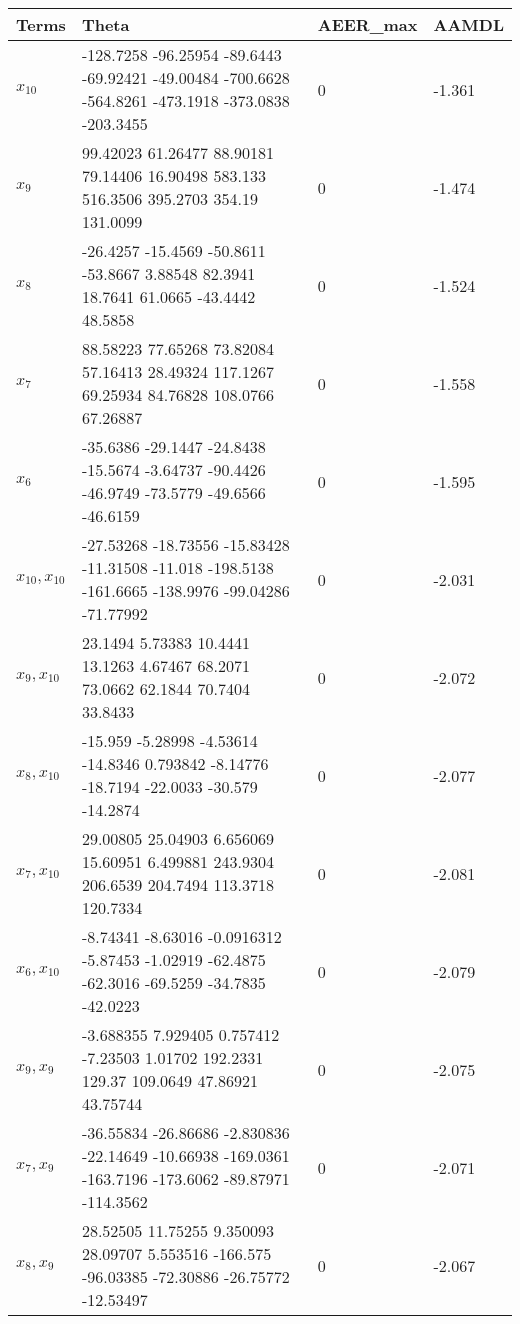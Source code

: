 \begin{tabular}{llll}
Terms & Theta & AEER_max & AAMDL \\ 
\hline 
$x_10$ & -128.7258     -96.25954      -89.6443     -69.92421     -49.00484     -700.6628     -564.8261     -473.1918     -373.0838     -203.3455 & 0 & -1.361 \\ 
$x_9$ & 99.42023      61.26477      88.90181      79.14406      16.90498       583.133      516.3506      395.2703        354.19      131.0099 & 0 & -1.474 \\ 
$x_8$ & -26.4257     -15.4569     -50.8611     -53.8667      3.88548      82.3941      18.7641      61.0665     -43.4442      48.5858 & 0 & -1.524 \\ 
$x_7$ & 88.58223      77.65268      73.82084      57.16413      28.49324      117.1267      69.25934      84.76828      108.0766      67.26887 & 0 & -1.558 \\ 
$x_6$ & -35.6386     -29.1447     -24.8438     -15.5674     -3.64737     -90.4426     -46.9749     -73.5779     -49.6566     -46.6159 & 0 & -1.595 \\ 
$x_10,x_10$ & -27.53268     -18.73556     -15.83428     -11.31508       -11.018     -198.5138     -161.6665     -138.9976     -99.04286     -71.77992 & 0 & -2.031 \\ 
$x_9,x_10$ & 23.1494      5.73383      10.4441      13.1263      4.67467      68.2071      73.0662      62.1844      70.7404      33.8433 & 0 & -2.072 \\ 
$x_8,x_10$ & -15.959     -5.28998     -4.53614     -14.8346     0.793842     -8.14776     -18.7194     -22.0033      -30.579     -14.2874 & 0 & -2.077 \\ 
$x_7,x_10$ & 29.00805      25.04903      6.656069      15.60951      6.499881      243.9304      206.6539      204.7494      113.3718      120.7334 & 0 & -2.081 \\ 
$x_6,x_10$ & -8.74341     -8.63016   -0.0916312     -5.87453     -1.02919     -62.4875     -62.3016     -69.5259     -34.7835     -42.0223 & 0 & -2.079 \\ 
$x_9,x_9$ & -3.688355      7.929405      0.757412      -7.23503       1.01702      192.2331        129.37      109.0649      47.86921      43.75744 & 0 & -2.075 \\ 
$x_7,x_9$ & -36.55834     -26.86686     -2.830836     -22.14649     -10.66938     -169.0361     -163.7196     -173.6062     -89.87971     -114.3562 & 0 & -2.071 \\ 
$x_8,x_9$ & 28.52505      11.75255      9.350093      28.09707      5.553516      -166.575     -96.03385     -72.30886     -26.75772     -12.53497 & 0 & -2.067 \\ 

\end{tabular}
